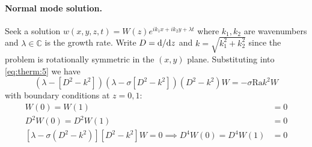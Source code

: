 \documentclass{jknotes}
\begin{document}
\paragraph{Normal mode solution.}
Seek a solution $w(x,y,z,t) = W(z) e^{ik_1x+ik_2y+\lambda t}$ where $k_1, k_2$
are wavenumbers and $\lambda \in \mathbb{C}$ is the growth rate. Write $D =
\diffd/\diffd z$ and $k = \sqrt{k_1^2+k_2^2}$ since the problem is
rotationally symmetric in the $(x,y)$ plane. Substituting into
\eqref{eq:therm:5} we have
\begin{equation}
	(\lambda - \left[ D^2 - k^2 \right])(\lambda - \sigma \left[ D^2 -
	k^2\right])(D^2-k^2)W = - \sigma \text{Ra}k^2 W
\end{equation}
with boundary conditions at $z=0,1$:
\begin{align}
	W(0) = W(1) &= 0 \\
	D^2 W(0) = D^2 W(1) &= 0 \\
	\left[ \lambda - \sigma (D^2 - k^2)\right]\left[D^2 - k^2\right] W = 0
	\implies D^4 W(0) = D^4 W(1) &= 0 
\end{align}
\end{document}
